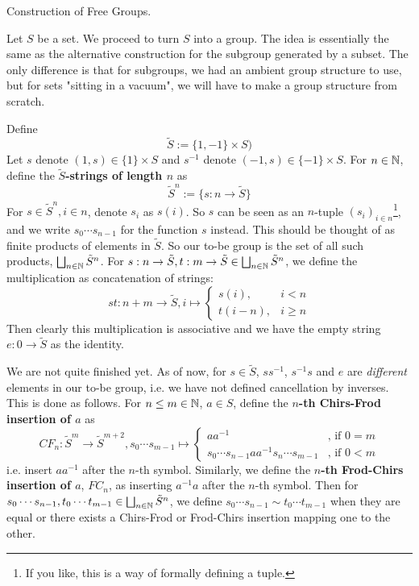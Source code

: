 \documentclass[../book.tex]{subfiles}
\begin{document}
\begin{ex} \dolater Construction of Free Groups. 

    Let $S$ be a set. We proceed to turn $S$ into a group.
    The idea is essentially the same as the alternative 
    construction for the subgroup generated by a subset.
    The only difference is that for subgroups, 
    we had an ambient group structure to use,
    but for sets "sitting in a vacuum", 
    we will have to make a group structure from scratch.
    
    Define 
    \[\tilde{S} := \{1,-1\}\times S)\]
    Let $s$ denote $(1,s) \in \{1\} \times S$ and
    $s^{-1}$ denote $(-1,s) \in \{-1\} \times S$. 
    For $n \in \mathbb{N}$, define the \textbf{$\tilde{S}$-strings of length $n$} as
    \[
        \tilde{S}^n := \{ s : n \to \tilde{S} \}
    \]
    For $s \in \tilde{S}^n, i \in n$, denote $s_i$ as $s(i)$.
    So $s$ can be seen as an $n$-tuple $(s_i)_{i \in n}$\footnote{If you like,
    this is a way of formally
    defining a tuple.},
    and we write $s_0\cdots s_{n-1}$ for the function $s$ instead.
    This should be thought of as finite products of elements in $\tilde{S}$.
    So our to-be group is the set of all such products, 
    $\bigsqcup_{n \in \mathbb{N}} \tilde{S}^n$.
    For 
    $s : n \to \tilde{S}, t : m \to \tilde{S} \in \bigsqcup_{n \in \mathbb{N}} \tilde{S}^n$,
    we define the multiplication as concatenation of strings: 
    \[
        st : n+m \to \tilde{S}, i \mapsto 
        \begin{cases}
            s(i), & i < n \\
            t(i-n), & i \geq n
        \end{cases}
    \]
    Then clearly this multiplication is associative and 
    we have the empty string $e : 0 \to \tilde{S}$ as the identity. 
    
    We are not quite finished yet.
    As of now, for $s \in \tilde{S}$, 
    $ss^{-1}$, $s^{-1}s$ and $e$ are \emph{different} elements in our to-be group,
    i.e. we have not defined cancellation by inverses. 
    This is done as follows. 
    For $n \leq m \in \mathbb{N}$, $a \in S$,  
    define the \textbf{$n$-th Chirs-Frod insertion of $a$}
    as 
    \[
        CF_n : \tilde{S}^m \to \tilde{S}^{m+2}, 
        s_0\cdots s_{m-1} \mapsto 
        \begin{cases}
        aa^{-1} & \text{, if } 0 = m\\
        s_0 \cdots s_{n-1} a a^{-1} s_n \cdots s_{m-1} & \text{, if } 0 < m
        \end{cases}
    \]
    i.e. insert $aa^{-1}$ after the $n$-th symbol. 
    Similarly, we define the \textbf{$n$-th Frod-Chirs insertion of $a$}, $FC_n$, 
    as inserting $a^{-1}a$ after the $n$-th symbol. 
    Then for 
    $s_0\cdots s_{n-1}, t_0\cdots t_{m-1} \in \bigsqcup_{n \in \mathbb{N}} \tilde{S}^n$, 
    we define $s_0\cdots s_{n-1} \sim t_0\cdots t_{m-1}$ when
    they are equal or there exists a Chirs-Frod or Frod-Chirs insertion
    mapping one to the other. 
    

\end{ex}
\end{document}
